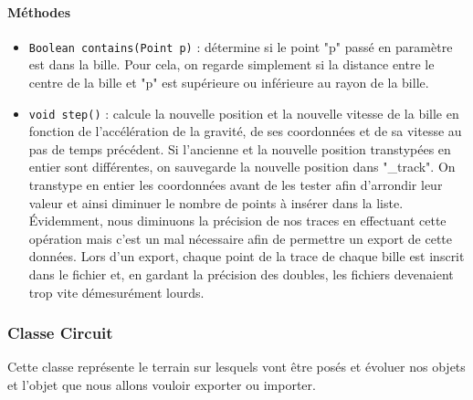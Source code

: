 \documentclass{report}
\begin{document}
\paragraph*{Méthodes}
\begin{itemize}
\item \texttt{Boolean contains(Point p)} : détermine si le point "p" passé en paramètre est dans la bille. Pour cela, on regarde simplement si la distance entre le centre de la bille et "p" est supérieure ou inférieure au rayon de la bille.
\item \texttt{void step()} : calcule la nouvelle position et la nouvelle vitesse de la bille en fonction de l'accélération de la gravité, de ses coordonnées et de sa vitesse au pas de temps précédent. Si l'ancienne et la nouvelle position transtypées en entier sont différentes, on sauvegarde la nouvelle position dans "\_track". On transtype en entier les coordonnées avant de les tester afin d'arrondir leur valeur et ainsi diminuer le nombre de points à insérer dans la liste. Évidemment, nous diminuons la précision de nos traces en effectuant cette opération mais c'est un mal nécessaire afin de permettre un export de cette données. Lors d'un export, chaque point de la trace de chaque bille est inscrit dans le fichier et, en gardant la précision des doubles, les fichiers devenaient trop vite démesurément lourds.
\end{itemize}

\newpage
\subsubsection{Classe Circuit}

Cette classe représente le terrain sur lesquels vont être posés et évoluer nos objets et l'objet que nous allons vouloir exporter ou importer.
\end{document}
